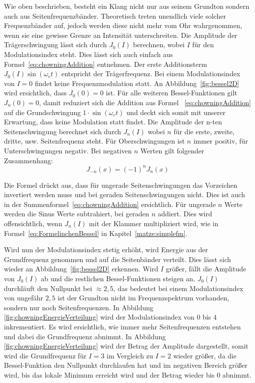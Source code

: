 Wie oben beschrieben, besteht ein Klang nicht nur aus seinem Grundton sondern auch aus Seitenfrequenzbänder. Theoretisch treten unendlich viele solcher Frequenzbänder auf, jedoch werden diese nicht mehr vom Ohr wahrgenommen, wenn sie eine gewisse Grenze an Intensität unterschreiten. \cite[S. 221]{lathi}
Die Amplitude der Trägerschwingung lässt sich durch $J_0(I)$ berechnen, wobei $I$ für den Modulationsindex steht. Dies lässt sich auch einfach aus Formel~\ref{eq:chowningAddition} entnehmen. Der erste Additionsterm $J_0(I)\sin(\omega_c t)$ entspricht der Trägerfrequenz. Bei einem Modulationsindex von $I=0$ findet keine Frequenzmodulation statt. An Abbildung~\ref{fig:bessel2D} wird ersichtlich, dass $J_0(0)=0$ ist. Für alle weiteren Bessel-Funktionen gilt $J_n(0)=0$, damit reduziert sich die Addition aus Formel~ \ref{eq:chowningAddition} auf die Grundschwingung $1\cdot\sin(\omega_c t)$ und deckt sich somit mit unserer Erwartung, dass keine Modulation statt findet. Die Amplitude der n-ten Seitenschwingung berechnet sich durch $J_n(I)$ wobei $n$ für die erste, zweite, dritte, usw. Seitenfrequenz steht. Für Oberschwingungen ist $n$ immer positiv, für Unterschwingungen negativ. Bei negativen $n$ Werten gilt folgender Zusammenhang: \cite[S. 223]{temme}
\begin{equation*}
J_{-n}(x)=(-1)^nJ_n(x)
\end{equation*}

Die Formel drückt aus, dass für ungerade Seitenschwingungen das Vorzeichen invertiert werden muss und bei geraden Seitenschwingungen nicht. Dies ist auch in der Summenformel~\ref{eq:chowningAddition} ersichtlich. Für ungerade $n$ Werte werden die Sinus Werte subtrahiert, bei geraden $n$ addiert. 
Dies wird offensichtlich, wenn $J_n(I)$ mit der Klammer multipliziert wird, wie in Formel~\ref{eq:FormelinchenBessel} in Kapitel~\ref{matze:simplefm}.

\label{bulli:besselModIndexZusammenahang}
Wird nun der Modulationsindex stetig erhöht, wird Energie aus der Grundfrequenz genommen und auf die Seitenbänder verteilt. Dies lässt sich wieder an Abbildung~\ref{fig:bessel2D} erkennen. Wird $I$ größer, fällt die Amplitude von $J_0(I)$ ab und die restlichen Bessel-Funktionen steigen an. $J_0(I)$ durchläuft den Nullpunkt bei $\approx2,5$, das bedeutet bei einem Modulationsindex von ungefähr $2,5$ ist der Grundton nicht im Frequenzspektrum vorhanden, sondern nur noch Seitenfrequenzen. In Abbildung~ \ref{fig:chowningEnergieVerteilung} wird der Modulationsindex von $0$ bis $4$ inkrementiert. Es wird ersichtlich, wie immer mehr Seitenfrequenzen entstehen und dabei die Grundfrequenz abnimmt. In Abbildung~ \ref{fig:chowningEnergieVerteilung} wird der Betrag der Amplitude dargestellt, somit wird die Grundfrequenz für $I=3$ im Vergleich zu $I=2$ wieder größer, da die Bessel-Funktion den Nullpunkt durchlaufen hat und im negativen Bereich größer wird, bis das lokale Minimum erreicht wird und der Betrag wieder bis $0$ abnimmt.

